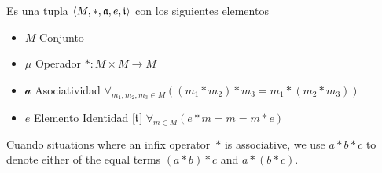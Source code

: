\begin{note}

\end{note}

\begin{defn}[Monoide]
Es una tupla $\langle M, *, \mathfrak{a}, e, \mathfrak{i} \rangle$ con los siguientes elementos
\begin{itemize}
\item $M$ Conjunto
\item $\mu$ Operador $* : M \times M \to M$
\item $\mathcal{a}$ Asociatividad $\forall_{m_1, m_2, m_3 \in M} ((m_1 * m_2) * m_3 = m_1 * (m_2 * m_3))$
\item $e$ Elemento Identidad [$\mathfrak{i}$] $\forall_{m \in M} ( e * m = m = m * e)$
\end{itemize}
\end{defn}


\begin{note}
Cuando situations where an infix operator~$*$ is associative, we use $a * b * c$ to denote either of the equal terms $(a * b) * c$ and $a * (b * c)$.
\end{note}